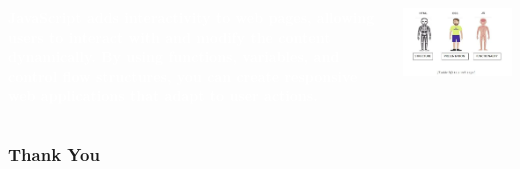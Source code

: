 \documentclass[aspectratio=169, table]{beamer}
\begin{document}
\begin{frame3}
    \vskip1cm
    \begin{tcolorbox}[standard jigsaw, opacityback=0, opacityframe=0, sharp corners, boxrule=0pt]
        \begin{columns}[T] %
            \begin{column}{0.5\textwidth}
                \textbf{\textcolor{white}{JavaScript adds interactivity to web pages, allowing users to interact with and modify the content dynamically. By using functions, variables, and control flow structures, you can create responsive web applications that adapt to user actions.}}
            \end{column}
            \begin{column}{0.5\textwidth}
                \includegraphics[width=1\textwidth]{classFiles/js_interactivity.png}
            \end{column}
        \end{columns}
    \end{tcolorbox}
\end{frame3}

\begin{frame4}
    \frametitle{Thank You}
\end{frame4}
\end{document}
